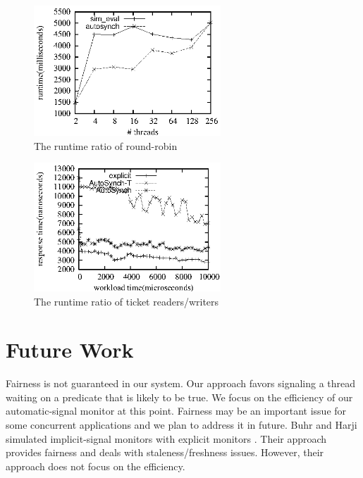\documentclass{sigplanconf}
\begin{document}
\begin{figure}[ht!]
  \centering
  \includegraphics[width=70mm]{fig/srr.eps}
  \caption{The runtime ratio of round-robin }
\label{fig:rr_ratio}
\end{figure}

\begin{figure}[ht!]
  \centering
  \includegraphics[width=70mm]{fig/strw.eps}
  \caption{The runtime ratio of ticket readers/writers}
\label{fig:trw_ratio}
\end{figure}


\section{Future Work} \label{sec:conclu}

Fairness is not guaranteed in our system. Our approach favors signaling a 
thread waiting on a predicate that is likely to be true. We focus on the 
efficiency of our automatic-signal monitor at this point.
Fairness may be an important issue for some concurrent applications and we plan
to address it in future. 
Buhr and Harji simulated implicit-signal monitors with explicit monitors
\cite{bh05}. Their approach provides fairness and deals with
staleness/freshness issues. However, their approach does not focus on the
efficiency.  
\end{document}
